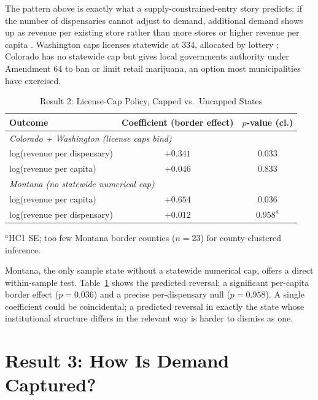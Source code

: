 \documentclass[5p]{elsarticle}
\begin{document}
The pattern above is exactly what a supply-constrained-entry story predicts: if the number of dispensaries
cannot adjust to demand, additional demand shows up as revenue per existing store rather than more stores or
higher revenue per capita \citep{BresnahanReiss1991,HollenbeckUetake2021}. Washington caps licenses statewide
at 334, allocated by lottery \citep{WSLCB2014LotteryPR}; Colorado has no statewide cap but gives local
governments authority under Amendment 64 to ban or limit retail marijuana, an option most municipalities have
exercised.

\begin{table}[h]
\centering
\caption{Result 2: License-Cap Policy, Capped vs.\ Uncapped States}
\label{tab:result2}
\small
\begin{tabular}{lcc}
\toprule
Outcome & Coefficient (border effect) & $p$-value (cl.) \\
\midrule
\multicolumn{3}{l}{\textit{Colorado + Washington (license caps bind)}} \\
log(revenue per dispensary) & $+0.341$ & $0.033$ \\
log(revenue per capita) & $+0.046$ & $0.833$ \\
\midrule
\multicolumn{3}{l}{\textit{Montana (no statewide numerical cap)}} \\
log(revenue per capita) & $+0.654$ & $0.036$ \\
log(revenue per dispensary) & $+0.012$ & $0.958^{a}$ \\
\bottomrule
\end{tabular}
\begin{minipage}{0.95\textwidth}
\vspace{0.2em}
\footnotesize $^{a}$HC1 SE; too few Montana border counties ($n=23$) for county-clustered inference.
\end{minipage}
\end{table}

Montana, the only sample state without a statewide numerical cap, offers a direct within-sample test.
Table~\ref{tab:result2} shows the predicted reversal: a significant per-capita border effect ($p=0.036$) and
a precise per-dispensary null ($p=0.958$). A single coefficient could be coincidental; a predicted reversal
in exactly the state whose institutional structure differs in the relevant way is harder to dismiss as one.

\section{Result 3: How Is Demand Captured?}
\end{document}
